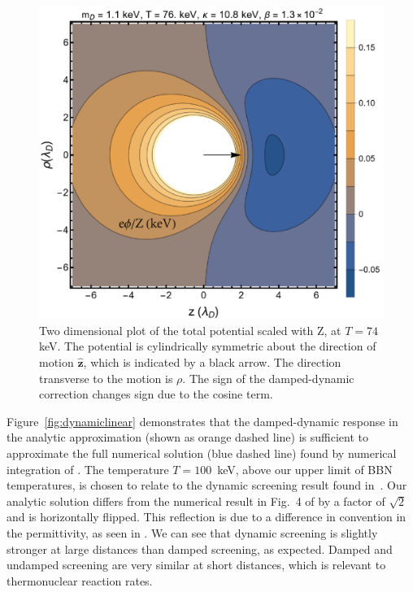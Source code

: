 \begin{figure} 
\centerline{\includegraphics[width=.80\linewidth]{plots/Pot_2DPlotFix.png}}
 \caption{Two dimensional plot of the total potential  scaled with Z, at $T=74\,$keV. The potential is cylindrically symmetric about the direction of motion $\boldsymbol{\hat{z}}$, which is indicated by a black arrow. The direction transverse to the motion is $\rho$. The sign of the damped-dynamic correction  changes sign due to the cosine term. }
 \label{fig:numericalComp}
\end{figure} 

Figure~\ref{fig:dynamiclinear} demonstrates that the damped-dynamic response in the analytic approximation  (shown as orange dashed line) is sufficient to approximate the full numerical solution (blue dashed line) found by numerical integration of . The temperature $T = 100$\, keV, above our upper limit of BBN temperatures, is chosen to relate to the dynamic screening result found in~\cite{Hwang:2021kno}. Our analytic solution differs from the numerical result in Fig.~4 of \cite{Hwang:2021kno} by a factor of $\sqrt{2}$ and is horizontally flipped. This reflection is due to a difference in convention in the permittivity, as seen in . We can see that dynamic screening is slightly stronger at large distances than damped screening, as expected. Damped and undamped screening are very similar at short distances, which is relevant to thermonuclear reaction rates. 

